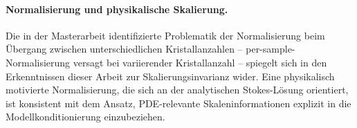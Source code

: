 \documentclass[a4paper,12pt]{article}
\begin{document}
\paragraph{Normalisierung und physikalische Skalierung.}
Die in der Masterarbeit identifizierte Problematik der Normalisierung beim Übergang zwischen unterschiedlichen Kristallanzahlen -- per-sample-Normalisierung versagt bei variierender Kristallanzahl -- spiegelt sich in den Erkenntnissen dieser Arbeit zur Skalierungsinvarianz wider. Eine physikalisch motivierte Normalisierung, die sich an der analytischen Stokes-Lösung orientiert, ist konsistent mit dem Ansatz, PDE-relevante Skaleninformationen explizit in die Modellkonditionierung einzubeziehen.
\end{document}
